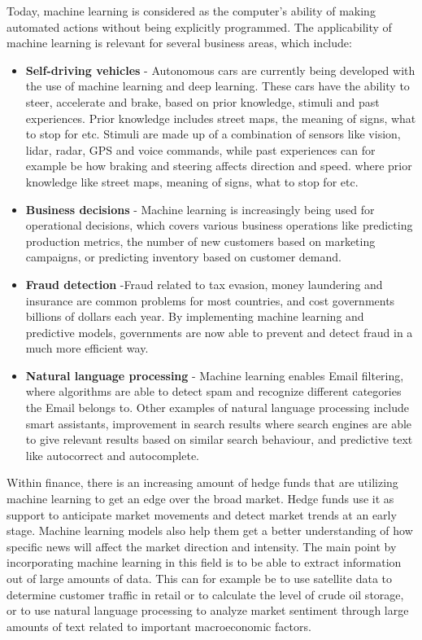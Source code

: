 \indent\newline
Today, machine learning is considered as the computer's ability of making automated actions without being explicitly programmed. The applicability of machine learning is relevant for several business areas, which include:
\indent \newline
\begin{itemize}
\item {\textbf{Self-driving vehicles} - Autonomous cars are currently being developed with the use of machine learning and deep learning. These cars have the ability to steer, accelerate and brake, based on prior knowledge, stimuli and past experiences. Prior knowledge includes street maps, the meaning of signs, what to stop for etc. Stimuli are made up of a combination of sensors like vision, lidar, radar, GPS and voice commands, while past experiences can for example be how braking and steering affects direction and speed.  where prior knowledge like street maps, meaning of signs, what to stop for etc.}
\item {\textbf{Business decisions} - Machine learning is increasingly being used for operational decisions, which covers various business operations like predicting production metrics, the number of new customers based on marketing campaigns, or predicting inventory based on customer demand.}
\item {\textbf{Fraud detection} -Fraud related to tax evasion, money laundering and insurance are common problems for most countries, and cost governments billions of dollars each year. By implementing machine learning and predictive models, governments are now able to prevent and detect fraud in a much more efficient way.}
\item {\textbf{Natural language processing} - Machine learning enables Email filtering, where algorithms are able to detect spam and recognize different categories the Email belongs to. Other examples of natural language processing include smart assistants, improvement in search results where search engines are able to give relevant results based on similar search behaviour, and predictive text like autocorrect and autocomplete.}
\end{itemize}

\indent\newline
Within finance, there is an increasing amount of hedge funds that are utilizing machine learning to get an edge over the broad market. Hedge funds use it as support to anticipate market movements and detect market trends at an early stage. Machine learning models also help them get a better understanding of how specific news will affect the market direction and intensity. The main point by incorporating machine learning in this field is to be able to extract information out of large amounts of data. This can for example be to use satellite data to determine customer traffic in retail or to calculate the level of crude oil storage, or to use natural language processing to analyze market sentiment through large amounts of text related to important macroeconomic factors.    

